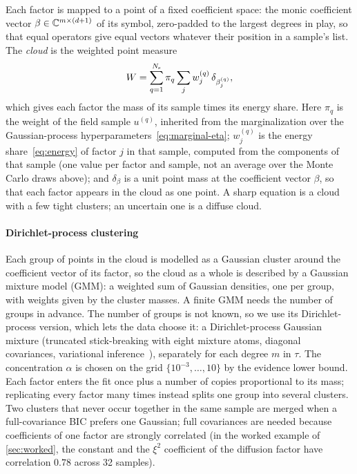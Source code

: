 Each factor is mapped to a point of a fixed coefficient space: the monic coefficient vector
$\beta\in\mathbb{C}^{m\times(d+1)}$ of its symbol, zero-padded to the largest degrees in play, so that equal
operators give equal vectors whatever their position in a sample's list. The \emph{cloud} is the weighted
point measure
\begin{equation}\label{eq:cloud}
  W=\sum_{q=1}^{N_{\mathrm s}}\pi_q\sum_jw_j^{(q)}\,\delta_{\beta_j^{(q)}},
\end{equation}
which gives each factor the mass of its sample times its energy share. Here $\pi_q$ is the weight of the field
sample $u^{(q)}$, inherited from the marginalization over the Gaussian-process hyperparameters~\eqref{eq:marginal-eta};
$w_j^{(q)}$ is the energy share~\eqref{eq:energy} of factor $j$ in that sample, computed from the components of that
sample (one value per factor and sample, not an average over the Monte Carlo draws above); and $\delta_{\beta}$ is a unit
point mass at the coefficient vector $\beta$, so that each factor appears in the cloud as one point. A sharp equation is a cloud with
a few tight clusters; an uncertain one is a diffuse cloud.

\paragraph{Dirichlet-process clustering}
Each group of points in the cloud is modelled as a Gaussian cluster around the coefficient vector of its factor, so
the cloud as a whole is described by a Gaussian mixture model (GMM): a weighted sum of Gaussian densities, one per
group, with weights given by the cluster masses. A finite GMM needs the number of groups in advance. The number of
groups is not known, so we use its Dirichlet-process version, which lets the data choose it: a Dirichlet-process Gaussian mixture
(truncated stick-breaking with eight mixture atoms, diagonal covariances, variational
inference~\cite{BleJor06}), separately for each degree $m$ in $\tau$. The concentration $\alpha$ is chosen
on the grid $\{10^{-3},\dots,10\}$ by the evidence lower bound. Each factor enters the fit once plus a
number of copies proportional to its mass; replicating every factor many times instead splits one group
into several clusters. Two clusters that never occur together in the same sample are merged when a
full-covariance BIC prefers one Gaussian; full covariances are needed because coefficients of one factor
are strongly correlated (in the worked example of \cref{sec:worked}, the constant and the $\xi^2$ coefficient of the diffusion factor
have correlation $0.78$ across 32 samples).

